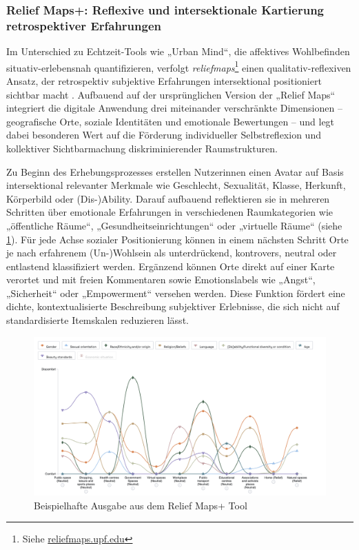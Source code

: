 \subsubsection*{Relief Maps+: Reflexive und intersektionale Kartierung retrospektiver Erfahrungen}

Im Unterschied zu Echtzeit-Tools wie „Urban Mind“, die affektives Wohlbefinden situativ-erlebensnah quantifizieren, verfolgt \textit{\gls{reliefmaps}}\footnote{Siehe \href{https://reliefmaps.upf.edu/}{reliefmaps.upf.edu}} einen qualitativ-reflexiven Ansatz, der retrospektiv subjektive Erfahrungen intersektional positioniert sichtbar macht \parencite{rodo-de-zarateDevelopingGeographiesIntersectionality2014}. Aufbauend auf der ursprünglichen Version der „Relief Maps“ integriert die digitale Anwendung drei miteinander verschränkte Dimensionen – geografische Orte, soziale Identitäten und emotionale Bewertungen – und legt dabei besonderen Wert auf die Förderung individueller Selbstreflexion und kollektiver Sichtbarmachung diskriminierender Raumstrukturen.

Zu Beginn des Erhebungsprozesses erstellen Nutzer\genderstern innen einen Avatar auf Basis intersektional relevanter Merkmale wie Geschlecht, Sexualität, Klasse, Herkunft, Körperbild oder (Dis-)Ability. Darauf aufbauend reflektieren sie in mehreren Schritten über emotionale Erfahrungen in verschiedenen Raumkategorien wie „öffentliche Räume“, „Gesundheitseinrichtungen“ oder „virtuelle Räume“ (siehe \cref{fig:relief_maps_plus_screenshot_1}). Für jede Achse sozialer Positionierung können in einem nächsten Schritt Orte je nach erfahrenem (Un-)Wohlsein als unterdrückend, kontrovers, neutral oder entlastend klassifiziert werden. Ergänzend können Orte direkt auf einer Karte verortet und mit freien Kommentaren sowie Emotionslabels wie „Angst“, „Sicherheit“ oder „Empowerment“ versehen werden. Diese Funktion fördert eine dichte, kontextualisierte Beschreibung subjektiver Erlebnisse, die sich nicht auf standardisierte Itemskalen reduzieren lässt.

\begin{figure}[htbp]
    \centering
    \includegraphics[width=\textwidth]{Arbeit/images/reliefmap.png}
    \caption{Beispielhafte Ausgabe aus dem Relief Maps+ Tool}
    \label{fig:relief_maps_plus_screenshot_1}
\end{figure}

